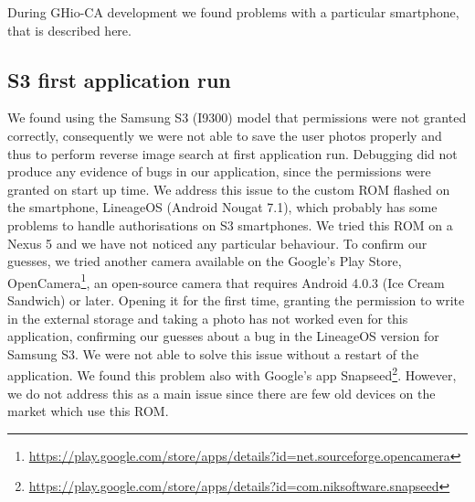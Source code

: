 During GHio-CA development we found problems with a particular smartphone, that 
is described here.

\subsection{S3 first application run}

We found using the Samsung S3 (I9300) model that permissions were not granted 
correctly, consequently we were not able to save the user photos properly and 
thus to perform reverse image search at first application run. Debugging did not 
produce any evidence of bugs in our application, since the permissions were 
granted on start up time.
We address this issue to the custom ROM flashed on the smartphone, LineageOS 
(Android Nougat 7.1), which probably has some problems to handle authorisations 
on S3 smartphones. We tried this ROM on a Nexus 5 and we have not noticed any 
particular behaviour.
To confirm our guesses, we tried another camera available on the Google's Play 
Store, OpenCamera\footnote{\url{
https://play.google.com/store/apps/details?id=net.sourceforge.opencamera}}, an 
open-source camera that requires Android 4.0.3 (Ice Cream Sandwich) or later.
Opening it for the first time, granting the permission to write in the external 
storage and taking a photo has not worked even for this application, confirming 
our guesses about a bug in the LineageOS version for Samsung S3.
We were not able to solve this issue without a restart of the application. We 
found this problem also with Google's app 
Snapseed\footnote{\url{
https://play.google.com/store/apps/details?id=com.niksoftware.snapseed}}.
However, we do not address this as a main issue since there are few old devices 
on the market which use this ROM.
